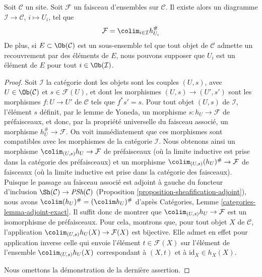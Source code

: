 \begin{lemma}
\label{lemma-colimit-representable}
Soit $\mathcal{C}$ un site. Soit $\mathcal{F}$ un faisceau d’ensembles sur
$\mathcal{C}$. Il existe alors un diagramme $\mathcal{I} \to \mathcal{C}$,
$i \mapsto U_i$, tel que
$$
\mathcal{F} = \colim_{i \in \mathcal{I}} h_{U_i}^\#
$$
De plus, si $E \subset \Ob(\mathcal{C})$ est un sous-ensemble tel que tout
objet de $\mathcal{C}$ admette un recouvrement par des éléments de $E$, nous pouvons
supposer que $U_i$ est un élément de $E$ pour tout $i \in \Ob(\mathcal{I})$.
\end{lemma}

\begin{proof}
Soit $\mathcal{I}$ la catégorie dont les objets sont les couples
$(U, s)$, avec $U \in \Ob(\mathcal{C})$ et $s \in \mathcal{F}(U)$,
et dont les morphismes $(U, s) \to (U', s')$ sont les morphismes $f : U \to U'$
de $\mathcal{C}$ tels que $f^*s' = s$. Pour tout objet $(U, s)$ de $\mathcal{I}$,
l’élément $s$ définit, par le lemme de Yoneda, un morphisme $s : h_U \to \mathcal{F}$
de préfaisceaux, et donc, par la propriété universelle du faisceau associé, un morphisme
$h_U^\# \to \mathcal{F}$. On voit immédiatement que ces morphismes sont compatibles
avec les morphismes de la catégorie $\mathcal{I}$. Nous obtenons ainsi
un morphisme $\colim_{(U, s)} h_U \to \mathcal{F}$ de préfaisceaux (où la
limite inductive est prise dans la catégorie des préfaisceaux) et un morphisme
$\colim_{(U, s)} (h_U)^\# \to \mathcal{F}$ de faisceaux (où la
limite inductive est prise dans la catégorie des faisceaux).
Puisque le passage au faisceau associé est adjoint à gauche du foncteur d’inclusion
$\Sh(\mathcal{C}) \to \textit{PSh}(\mathcal{C})$
(Proposition \ref{proposition-sheafification-adjoint}), nous avons
$\colim (h_U)^\# = (\colim h_U)^\#$ d’après
Catégories, Lemme \ref{categories-lemma-adjoint-exact}.
Il suffit donc de montrer que $\colim_{(U, s)} h_U \to \mathcal{F}$
est un isomorphisme de préfaisceaux. Pour cela, montrons que, pour tout objet
$X$ de $\mathcal{C}$, l’application $\colim_{(U, s)} h_U(X) \to \mathcal{F}(X)$
est bijective. Elle admet en effet pour application inverse celle qui envoie l’élément
$t \in \mathcal{F}(X)$ sur l’élément de l’ensemble $\colim_{(U, s)} h_U(X)$
correspondant à $(X, t)$ et à $\text{id}_X \in h_X(X)$.

\medskip\noindent
Nous omettons la démonstration de la dernière assertion.
\end{proof}




